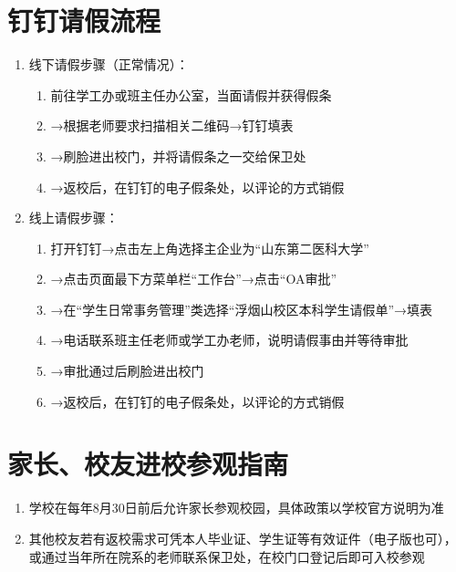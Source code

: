 \section[钉钉请假流程]{钉钉请假\footnotemark 流程}
\label{leave_dingtalk}
\begin{enumerate}
      \item 线下请假步骤（正常情况）：
            \begin{enumerate}
                  \item 前往学工办或班主任办公室，当面请假并获得假条
                  \item →根据老师要求扫描相关二维码→钉钉填表
                  \item →刷脸进出校门，并将请假条之一交给保卫处
                  \item →返校后，在钉钉的电子假条处，以评论的方式销假
            \end{enumerate}
      \item 线上请假步骤：
            \begin{enumerate}
                  \item 打开钉钉→点击左上角选择主企业为“山东第二医科大学”
                  \item →点击页面最下方菜单栏“工作台”→点击“OA审批”
                  \item →在“学生日常事务管理”类选择“浮烟山校区本科学生请假单”→填表
                  \item →电话联系班主任老师或学工办老师，说明请假事由并等待审批
                  \item →审批通过后刷脸进出校门
                  \item →返校后，在钉钉的电子假条处，以评论的方式销假
            \end{enumerate}
\end{enumerate}

\section[家长、校友进校参观指南]{家长、校友进校参观指南\footnotemark}
\begin{enumerate}
      \item 学校在每年8月30日前后允许家长参观校园\footnotemark，具体政策以学校官方说明为准
      \item 其他校友若有返校需求可凭本人毕业证、学生证等有效证件（电子版也可），或通过当年所在院系的老师联系保卫处，在校门口登记后即可入校参观
\end{enumerate}

